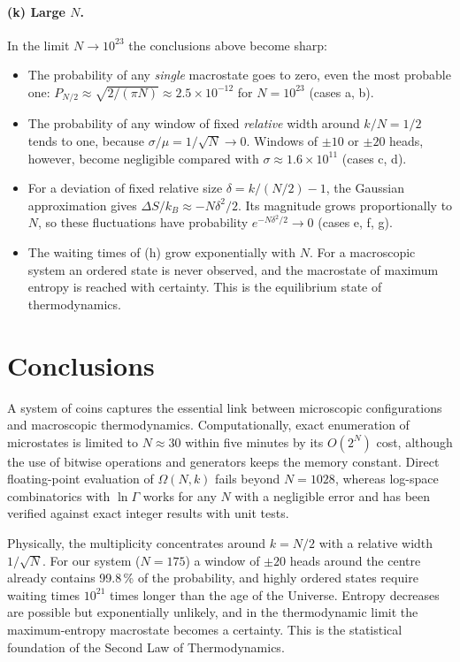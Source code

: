 \documentclass[11pt,a4paper]{article}
\newcommand{\resN}{175}                 %
\newcommand{\resNOverflow}{1028}            %
\begin{document}
\paragraph{(k) Large $N$.} In the limit $N\to10^{23}$ the conclusions above
become sharp:
\begin{itemize}
  \item The probability of any \emph{single} macrostate goes to zero, even the
        most probable one: $P_{N/2}\approx\sqrt{2/(\pi N)}\approx2.5\times10^{-12}$
        for $N=10^{23}$ (cases a, b).
  \item The probability of any window of fixed \emph{relative} width around
        $k/N=1/2$ tends to one, because $\sigma/\mu=1/\sqrt{N}\to0$. Windows of
        $\pm10$ or $\pm20$ heads, however, become negligible compared with
        $\sigma\approx1.6\times10^{11}$ (cases c, d).
  \item For a deviation of fixed relative size $\delta=k/(N/2)-1$, the Gaussian
        approximation gives $\Delta S/k_B\approx-N\delta^2/2$. Its magnitude
        grows proportionally to $N$, so these fluctuations have probability
        $e^{-N\delta^2/2}\to0$ (cases e, f, g).
  \item The waiting times of (h) grow exponentially with $N$. For a
        macroscopic system an ordered state is never observed, and the
        macrostate of maximum entropy is reached with certainty. This is the
        equilibrium state of thermodynamics.
\end{itemize}

\section{Conclusions}
A system of coins captures the essential link between microscopic
configurations and macroscopic thermodynamics. Computationally, exact
enumeration of microstates is limited to $N\approx30$ within five
minutes by its $O(2^N)$ cost, although the use of bitwise operations and
generators keeps the memory constant. Direct floating-point evaluation of
$\Omega(N,k)$ fails beyond $N=\resNOverflow$, whereas log-space combinatorics
with $\ln\Gamma$ works for any $N$ with a negligible error and has been
verified against exact integer results with unit tests.

Physically, the multiplicity concentrates around $k=N/2$ with a relative
width $1/\sqrt{N}$. For our system ($N=\resN$) a window of $\pm20$ heads
around the centre already contains 99.8\,\% of the probability, and highly
ordered states require waiting times $10^{21}$ times longer than the age of
the Universe. Entropy decreases are possible but exponentially unlikely, and
in the thermodynamic limit the maximum-entropy macrostate becomes a
certainty. This is the statistical foundation of the Second Law of
Thermodynamics.
\end{document}
